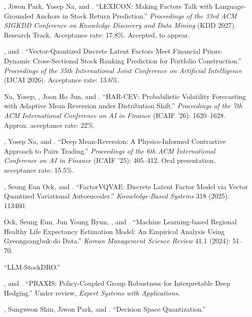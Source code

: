\documentclass[11pt]{article}
\begin{document}
\begin{nlist}
\item[{[5]}] \mefirst, Jiwon Park, Yosep Na, and \song. ``LEXICON: Making Factors Talk with Language-Grounded Anchors in Stock Return Prediction.'' \textit{Proceedings of the 33rd ACM SIGKDD Conference on Knowledge Discovery and Data Mining} (KDD 2027). Research Track. Acceptance rate: 17.8\%. Accepted, to appear.
\item[{[4]}] \mefirst, and \song. ``Vector-Quantized Discrete Latent Factors Meet Financial Priors: Dynamic Cross-Sectional Stock Ranking Prediction for Portfolio Construction.'' \textit{Proceedings of the 35th International Joint Conference on Artificial Intelligence} (IJCAI 2026). Acceptance rate: 13.6\%.
\item[{[3]}] Na, Yosep, \me, Joon Ho Jun, and \song. ``HAR-CEV: Probabilistic Volatility Forecasting with Adaptive Mean Reversion under Distribution Shift.'' \textit{Proceedings of the 7th ACM International Conference on AI in Finance} (ICAIF '26): 1620–1628. Approx. acceptance rate: 22\%.
\item[{[2]}] \mefirst, Yosep Na, and \song. ``Deep Mean-Reversion: A Physics-Informed Contrastive Approach to Pairs Trading.'' \textit{Proceedings of the 6th ACM International Conference on AI in Finance} (ICAIF '25): 405–412. Oral presentation, acceptance rate: 15.5\%.
\item[{[1]}] \mefirst, Seung Eun Ock, and \song. ``FactorVQVAE: Discrete Latent Factor Model via Vector Quantized Variational Autoencoder.'' \textit{Knowledge-Based Systems} 318 (2025): 113460.
\end{nlist}
\begin{nlist}
\item[{[1]}] Ock, Seung Eun, Jun Young Byun, \me, and \song. ``Machine Learning-based Regional Healthy Life Expectancy Estimation Model: An Empirical Analysis Using Gyeongsangbuk-do Data.'' \textit{Korean Management Science Review} 41.1 (2024): 51–70.
\end{nlist}
\begin{nlist}
\item[{[3]}] ``LLM-StockDRO.''
\item[{[2]}] \mefirst, and \song. ``PRAXIS: Policy-Coupled Group Robustness for Interpretable Deep Hedging.'' Under review, \textit{Expert Systems with Applications}.
\item[{[1]}] \mefirst, Sungweon Shin, Jiwon Park, and \song. ``Decision Space Quantization.''
\end{nlist}
\end{document}
